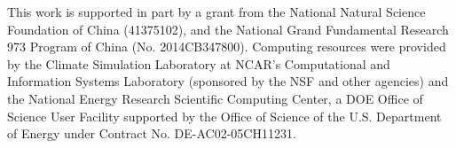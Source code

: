 \documentclass[gmd, manuscript]{copernicus}
\begin{document}









\begin{acknowledgements}
This work is supported in part by a grant from the National Natural Science Foundation of China (41375102), and the National Grand Fundamental Research 973 Program of China (No. 2014CB347800). Computing resources were provided by the Climate Simulation Laboratory at NCAR's Computational and Information Systems Laboratory (sponsored by the NSF and other agencies) and the National Energy Research Scientific Computing Center, a DOE Office of Science User Facility supported by the Office of Science of the U.S. Department of Energy under Contract No. DE-AC02-05CH11231.
\end{acknowledgements}




%
%
\end{document}
